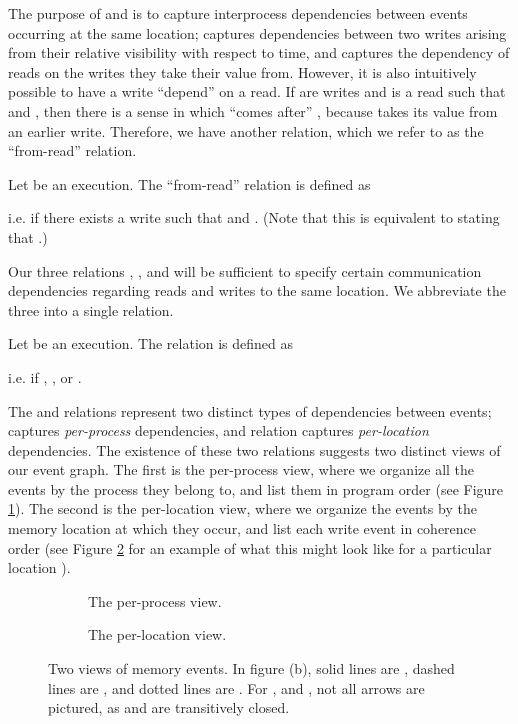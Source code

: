 \documentclass[]{eptcs}
\newenvironment{definition}[1][Definition.]{\begin{trivlist}
\item[\hskip \labelsep {\bfseries #1}]}{\end{trivlist}}
\begin{document}
The purpose of  and  is to capture interprocess dependencies between events occurring at the same location;  captures dependencies between two writes arising from their relative visibility with respect to time, and  captures the dependency of reads on the writes they take their value from. However, it is also intuitively possible to have a write ``depend'' on a read. If  are writes and  is a read such that  and , then there is a sense in which  ``comes after'' , because  takes its value from an earlier write. Therefore, we have another relation, which we refer to as the ``from-read'' relation.

\begin{definition}
Let  be an execution. The ``from-read'' relation  is defined as

i.e.  if there exists a write  such that  and . (Note that this is equivalent to stating that .)
\end{definition}

Our three relations , , and  will be sufficient to specify certain communication dependencies regarding reads and writes to the same location. We abbreviate the three into a single relation.

\begin{definition}
Let  be an execution. The relation  is defined as

i.e.  if , , or .
\end{definition}

The  and  relations represent two distinct types of dependencies between events;  captures \emph{per-process} dependencies, and  relation captures \emph{per-location} dependencies. The existence of these two relations suggests two distinct views of our event graph. The first is the per-process view, where we organize all the events by the process they belong to, and list them in program order (see Figure \ref{events:process}). The second is the per-location view, where we organize the events by the memory location at which they occur, and list each write event in coherence order (see Figure \ref{events:location} for an example of what this might look like for a particular location ).
\begin{figure}[t]
\begin{subfigure}{.5\textwidth}

\caption{The per-process view.}
\label{events:process}
\end{subfigure}
\begin{subfigure}{.5\textwidth}

\caption{The per-location view.}
\label{events:location}
\end{subfigure}
\caption{Two views of memory events. In figure (b), solid lines are , dashed lines are , and dotted lines are . For ,  and , not all arrows are pictured, as  and  are transitively closed.}
\label{events}
\end{figure}
\end{document}
